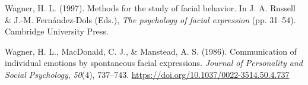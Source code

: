 \documentclass[
  english,
  doc]{apa7}
\newlength{\cslhangindent}
\newenvironment{cslreferences}%
  {\setlength{\parindent}{0pt}%
  \everypar{\setlength{\hangindent}{\cslhangindent}}\ignorespaces}%
  {\par}
\begin{document}
\begin{cslreferences}
\leavevmode\hypertarget{ref-wagner1997methods}{}%
Wagner, H. L. (1997). Methods for the study of facial behavior. In J. A. Russell \& J.-M. Fernández-Dols (Eds.), \emph{The psychology of facial expression} (pp. 31--54). Cambridge University Press.

\leavevmode\hypertarget{ref-wagner1986communication}{}%
Wagner, H. L., MacDonald, C. J., \& Manstead, A. S. (1986). Communication of individual emotions by spontaneous facial expressions. \emph{Journal of Personality and Social Psychology}, \emph{50}(4), 737--743. \url{https://doi.org/10.1037/0022-3514.50.4.737}
\end{cslreferences}

\endgroup
\end{document}
